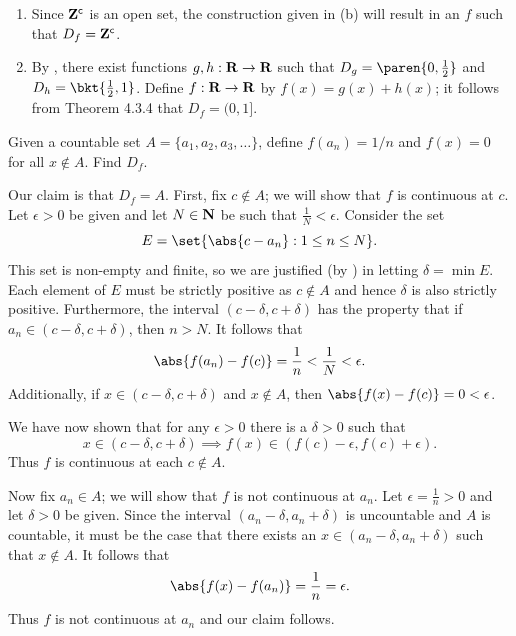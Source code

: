 \documentclass{lew98_solutions}
\begin{document}
\begin{solution}
    \begin{enumerate}
        \item Since \( \mathbf{Z}^{\mathsf{c}} \) is an open set, the construction given in  (b) will result in an \( f \) such that \( D_f = \mathbf{Z}^{\mathsf{c}} \).

        \item By , there exist functions \( g, h : \mathbf{R} \to \mathbf{R} \) such that \( D_g = \paren{0, \tfrac{1}{2}} \) and \( D_h = \bkt{\tfrac{1}{2}, 1} \). Define \( f : \mathbf{R} \to \mathbf{R} \) by \( f(x) = g(x) + h(x) \); it follows from Theorem 4.3.4 that \( D_f = (0, 1] \).
    \end{enumerate}
\end{solution}

\begin{exercise}
\label{ex:4.6.2}
    Given a countable set \( A = \{ a_1, a_2, a_3, \ldots \} \), define \( f(a_n) = 1/n \) and \( f(x) = 0 \) for all \( x \not\in A \). Find \( D_f \).
\end{exercise}

\begin{solution}
    Our claim is that \( D_f = A \). First, fix \( c \not\in A \); we will show that \( f \) is continuous at \( c \). Let \( \epsilon > 0 \) be given and let \( N \in \mathbf{N} \) be such that \( \tfrac{1}{N} < \epsilon \). Consider the set
    \[
        E = \set{ \abs{c - a_n} : 1 \leq n \leq N }.
    \]
    This set is non-empty and finite, so we are justified (by ) in letting \( \delta = \min E \). Each element of \( E \) must be strictly positive as \( c \not\in A \) and hence \( \delta \) is also strictly positive. Furthermore, the interval \( (c - \delta, c + \delta) \) has the property that if \( a_n \in (c - \delta, c + \delta) \), then \( n > N \). It follows that
    \[
        \abs{f(a_n) - f(c)} = \frac{1}{n} < \frac{1}{N} < \epsilon.
    \]
    Additionally, if \( x \in (c - \delta, c + \delta) \) and \( x \not\in A \), then \( \abs{f(x) - f(c)} = 0 < \epsilon \).
    
    We have now shown that for any \( \epsilon > 0 \) there is a \( \delta > 0 \) such that
    \[
        x \in (c - \delta, c + \delta) \implies f(x) \in (f(c) - \epsilon, f(c) + \epsilon).
    \]
    Thus \( f \) is continuous at each \( c \not\in A \).

    Now fix \( a_n \in A \); we will show that \( f \) is not continuous at \( a_n \). Let \( \epsilon = \tfrac{1}{n} > 0 \) and let \( \delta > 0 \) be given. Since the interval \( (a_n - \delta, a_n + \delta) \) is uncountable and \( A \) is countable, it must be the case that there exists an \( x \in (a_n - \delta, a_n + \delta) \) such that \( x \not\in A \). It follows that
    \[
        \abs{f(x) - f(a_n)} = \frac{1}{n} = \epsilon.
    \]
    Thus \( f \) is not continuous at \( a_n \) and our claim follows.
\end{solution}
\end{document}
